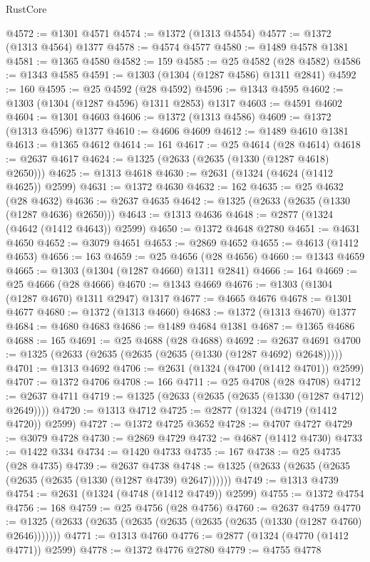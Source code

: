 \begin{lexlean}{RustCore}
\begin{coremodule}
@4572 := @1301 @4571
@4574 := @1372 (@1313 @4554)
@4577 := @1372 (@1313 @4564) @1377
@4578 := @4574 @4577
@4580 := @1489 @4578 @1381
@4581 := @1365 @4580
@4582 := 159
@4585 := @25 @4582 (@28 @4582)
@4586 := @1343 @4585
@4591 := @1303 (@1304 (@1287 @4586) @1311 @2841)
@4592 := 160
@4595 := @25 @4592 (@28 @4592)
@4596 := @1343 @4595
@4602 := @1303 (@1304 (@1287 @4596) @1311 @2853) @1317
@4603 := @4591 @4602
@4604 := @1301 @4603
@4606 := @1372 (@1313 @4586)
@4609 := @1372 (@1313 @4596) @1377
@4610 := @4606 @4609
@4612 := @1489 @4610 @1381
@4613 := @1365 @4612
@4614 := 161
@4617 := @25 @4614 (@28 @4614)
@4618 := @2637 @4617
@4624 := @1325 (@2633 (@2635 (@1330 (@1287 @4618) @2650)))
@4625 := @1313 @4618
@4630 := @2631 (@1324 (@4624 (@1412 @4625)) @2599)
@4631 := @1372 @4630
@4632 := 162
@4635 := @25 @4632 (@28 @4632)
@4636 := @2637 @4635
@4642 := @1325 (@2633 (@2635 (@1330 (@1287 @4636) @2650)))
@4643 := @1313 @4636
@4648 := @2877 (@1324 (@4642 (@1412 @4643)) @2599)
@4650 := @1372 @4648 @2780
@4651 := @4631 @4650
@4652 := @3079 @4651
@4653 := @2869 @4652
@4655 := @4613 (@1412 @4653)
@4656 := 163
@4659 := @25 @4656 (@28 @4656)
@4660 := @1343 @4659
@4665 := @1303 (@1304 (@1287 @4660) @1311 @2841)
@4666 := 164
@4669 := @25 @4666 (@28 @4666)
@4670 := @1343 @4669
@4676 := @1303 (@1304 (@1287 @4670) @1311 @2947) @1317
@4677 := @4665 @4676
@4678 := @1301 @4677
@4680 := @1372 (@1313 @4660)
@4683 := @1372 (@1313 @4670) @1377
@4684 := @4680 @4683
@4686 := @1489 @4684 @1381
@4687 := @1365 @4686
@4688 := 165
@4691 := @25 @4688 (@28 @4688)
@4692 := @2637 @4691
@4700 := @1325 (@2633 (@2635 (@2635 (@2635 (@1330 (@1287 @4692) @2648)))))
@4701 := @1313 @4692
@4706 := @2631 (@1324 (@4700 (@1412 @4701)) @2599)
@4707 := @1372 @4706
@4708 := 166
@4711 := @25 @4708 (@28 @4708)
@4712 := @2637 @4711
@4719 := @1325 (@2633 (@2635 (@2635 (@1330 (@1287 @4712) @2649))))
@4720 := @1313 @4712
@4725 := @2877 (@1324 (@4719 (@1412 @4720)) @2599)
@4727 := @1372 @4725 @3652
@4728 := @4707 @4727
@4729 := @3079 @4728
@4730 := @2869 @4729
@4732 := @4687 (@1412 @4730)
@4733 := @1422 @334
@4734 := @1420 @4733
@4735 := 167
@4738 := @25 @4735 (@28 @4735)
@4739 := @2637 @4738
@4748 := @1325 (@2633 (@2635 (@2635 (@2635 (@2635 (@1330 (@1287 @4739) @2647))))))
@4749 := @1313 @4739
@4754 := @2631 (@1324 (@4748 (@1412 @4749)) @2599)
@4755 := @1372 @4754
@4756 := 168
@4759 := @25 @4756 (@28 @4756)
@4760 := @2637 @4759
@4770 := @1325 (@2633 (@2635 (@2635 (@2635 (@2635 (@2635 (@1330 (@1287 @4760) @2646)))))))
@4771 := @1313 @4760
@4776 := @2877 (@1324 (@4770 (@1412 @4771)) @2599)
@4778 := @1372 @4776 @2780
@4779 := @4755 @4778

\end{coremodule}
\end{lexlean}
